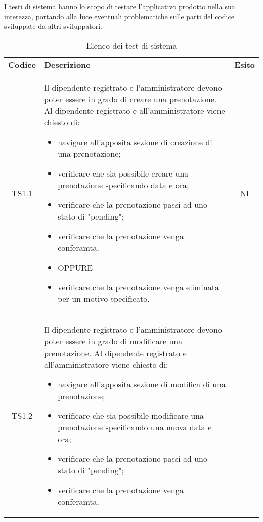I testi di sistema hanno lo scopo di testare l’applicativo prodotto nella sua interezza, portando alla luce eventuali problematiche sulle parti del codice sviluppate da altri sviluppatori.
{
    \renewcommand{\arraystretch}{1.5}
    \centering
    \begin{longtable}{ c C{11cm} c }
        \caption{Elenco dei test di sistema}\\
        \rowcolor{\primaryColor}
        \textcolor{\secondaryColor}{
        \textbf{Codice}}     & \textcolor{\secondaryColor}
        {\textbf{Descrizione}} & \textcolor{\secondaryColor}{\textbf{Esito}} \\

        TS1.1&
        Il dipendente registrato e l'amministratore devono poter essere in grado di creare una prenotazione.\newline
        Al dipendente registrato e all'amministratore viene chiesto di:
        \begin{itemize}
            \item navigare all'apposita sezione di creazione di una prenotazione;
            \item verificare che sia possibile creare una prenotazione specificando data e ora;
            \item verificare che la prenotazione passi ad uno stato di "pending";
            \item verificare che la prenotazione venga conferamta.
            \item [] OPPURE
            \item verificare che la prenotazione venga eliminata per un motivo specificato.
        \end{itemize}&
        NI\\
        TS1.2&
        Il dipendente registrato e l'amministratore devono poter essere in grado di modificare una prenotazione.\newline
        Al dipendente registrato e all'amministratore viene chiesto di:
        \begin{itemize}
            \item navigare all'apposita sezione di modifica di una prenotazione;
            \item verificare che sia possibile modificare una prenotazione specificando una nuova data e ora;
            \item verificare che la prenotazione passi ad uno stato di "pending";
            \item verificare che la prenotazione venga conferamta.

\end{itemize}
\end{longtable}}
